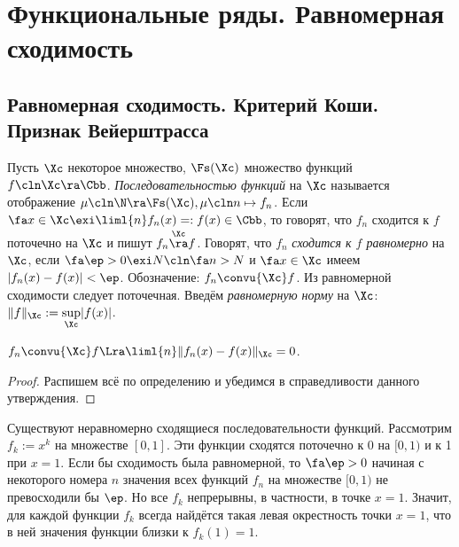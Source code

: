 \documentclass[a4paper]{article}
\begin{document}
\section{Функциональные ряды. Равномерная сходимость}

\subsection{Равномерная сходимость. Критерий Коши. Признак Вейерштрасса}

\begin{df}
Пусть $\Xc$ некоторое множество, $\Fs(\Xc)$ множество функций $f\cln \Xc \ra \Cbb$. \emph{Последовательностью функций} на $\Xc$ называется
отображение $\mu\cln \N \ra \Fs(\Xc), \mu\cln n \mapsto f_n$. Если $\fa x \in \Xc \exi \liml{n} f_n(x) =: f(x) \in \Cbb$, то говорят, что
$f_n$ сходится к $f$ поточечно на $\Xc$ и пишут $f_n \overset{\Xc}{\ra} f$. Говорят, что $f_n$ \emph{сходится к $f$ равномерно} на $\Xc$,
если $\fa \ep > 0 \exi N\cln \fa n > N$ и $\fa x \in \Xc$ имеем $|f_n(x)-f(x)| < \ep$.
Обозначение: $f_n \convu{\Xc} f$. Из равномерной сходимости следует поточечная. Введём \emph{равномерную норму}
на $\Xc$: $\|f\|_\Xc := \underset{\Xc}{\sup} |f(x)|$.
\end{df}

\begin{theorem}
$f_n \convu{\Xc} f \Lra \liml{n}\|f_n(x)-f(x)\|_\Xc = 0$.
\end{theorem}
\begin{proof}
Распишем всё по определению и убедимся в справедливости данного утверждения.
\end{proof}

\begin{note}
Существуют неравномерно сходящиеся последовательности функций. Рассмотрим $f_k := x^k$ на множестве $[0,1]$. Эти функции
сходятся поточечно к 0 на $[0,1)$ и к 1 при $x=1$. Если бы сходимость была равномерной, то $\fa \ep > 0$ начиная с некоторого номера $n$
значения всех функций $f_n$ на множестве $[0,1)$ не превосходили бы $\ep$. Но все $f_k$ непрерывны, в частности, в точке $x=1$. Значит,
для каждой функции $f_k$ всегда найдётся такая левая окрестность точки $x=1$, что в ней значения функции близки к $f_k(1)=1$.
\end{note}
\end{document}
